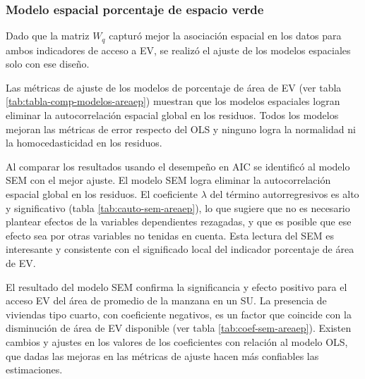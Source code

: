 \documentclass[12pt,a4paper,oneside, openany]{book}
\theoremstyle{definition}
\theoremstyle{definition}
\theoremstyle{definition}
\theoremstyle{remark}
\begin{document}
\subsubsection{Modelo espacial porcentaje de espacio
verde}\label{modelo-espacial-porcentaje-de-espacio-verde}

Dado que la matriz \(W_q\) capturó mejor la asociación espacial en los
datos para ambos indicadores de acceso a EV, se realizó el ajuste de los
modelos espaciales solo con ese diseño.

Las métricas de ajuste de los modelos de porcentaje de área de EV (ver
tabla \ref{tab:tabla-comp-modelos-areaep}) muestran que los modelos
espaciales logran eliminar la autocorrelación espacial global en los
residuos. Todos los modelos mejoran las métricas de error respecto del
OLS y ninguno logra la normalidad ni la homocedasticidad en los
residuos.

Al comparar los resultados usando el desempeño en AIC se identificó al
modelo SEM con el mejor ajuste. El modelo SEM logra eliminar la
autocorrelación espacial global en los residuos. El coeficiente
\(\lambda\) del término autorregresivos es alto y significativo (tabla
\ref{tab:cauto-sem-areaep}), lo que sugiere que no es necesario plantear
efectos de la variables dependientes rezagadas, y que es posible que ese
efecto sea por otras variables no tenidas en cuenta. Esta lectura del
SEM es interesante y consistente con el significado local del indicador
porcentaje de área de EV.

El resultado del modelo SEM confirma la significancia y efecto positivo
para el acceso EV del área de promedio de la manzana en un SU. La
presencia de viviendas tipo cuarto, con coeficiente negativos, es un
factor que coincide con la disminución de área de EV disponible (ver
tabla \ref{tab:coef-sem-areaep}). Existen cambios y ajustes en los
valores de los coeficientes con relación al modelo OLS, que dadas las
mejoras en las métricas de ajuste hacen más confiables las estimaciones.
\end{document}
